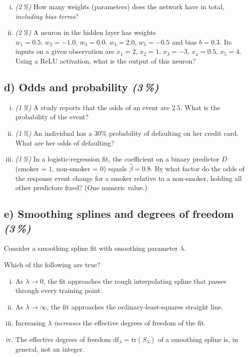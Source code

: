 \documentclass[11pt,a4paper]{article}
\newcommand{\subpoints}[1]{\textit{(#1\,\%)}}
\begin{document}
\begin{enumerate}[(i)]
  \item \subpoints{2} How many weights (parameters) does the network have in total, \emph{including bias terms}?
  \item \subpoints{2} A neuron in the hidden layer has weights $w_1 = 0.5,\, w_2 = -1.0,\, w_3 = 0.0,\, w_4 = 2.0,\, w_5 = -0.5$ and bias $b = 0.3$. Its inputs on a given observation are $x_1 = 2,\, x_2 = 1,\, x_3 = -3,\, x_4 = 0.5,\, x_5 = 4$. Using a ReLU activation, what is the output of this neuron?
\end{enumerate}

\subsection*{d) Odds and probability \subpoints{3}}
\begin{enumerate}[(i)]
  \item \subpoints{1} A study reports that the odds of an event are $2.5$. What is the probability of the event?
  \item \subpoints{1} An individual has a $30\%$ probability of defaulting on her credit card. What are her odds of defaulting?
  \item \subpoints{1} In a logistic-regression fit, the coefficient on a binary predictor $D$ (smoker = $1$, non-smoker = $0$) equals $\hat\beta = 0.8$. By what factor do the odds of the response event change for a smoker relative to a non-smoker, holding all other predictors fixed? (One numeric value.)
\end{enumerate}

\subsection*{e) Smoothing splines and degrees of freedom \subpoints{3}}
Consider a smoothing spline fit with smoothing parameter $\lambda$.

Which of the following are true?
\begin{enumerate}[(i)]
  \item As $\lambda \to 0$, the fit approaches the rough interpolating spline that passes through every training point.
  \item As $\lambda \to \infty$, the fit approaches the ordinary-least-squares straight line.
  \item Increasing $\lambda$ \emph{increases} the effective degrees of freedom of the fit.
  \item The effective degrees of freedom $\mathrm{df}_\lambda = \mathrm{tr}(S_\lambda)$ of a smoothing spline is, in general, not an integer.
\end{enumerate}
\end{document}
